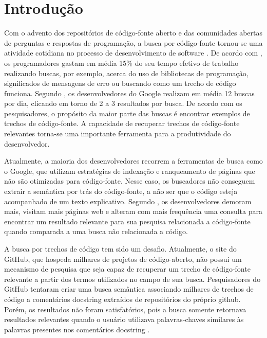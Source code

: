 \chapter{Introdução}
\label{cap:introducao}


Com o advento dos repositórios de código-fonte aberto e das comunidades abertas de perguntas e respostas de programação, a busca por código-fonte tornou-se uma atividade cotidiana no processo de desenvolvimento de software \citep{towards-summarizing-source-code-search:marin:2020}. De acordo com \cite{what-developers-search-for-on-the-web:xia:2017}, os programadores gastam em média 15\% do seu tempo efetivo de trabalho realizando buscas, por exemplo, acerca do uso de bibliotecas de programação, significados de mensagens de erro ou buscando como um trecho de código funciona. Segundo \cite{sadowski-how-developers-search-for-code-case-study:2015}, os desenvolvedores do Google realizam em média 12 buscas por dia, clicando em torno de 2 a 3 resultados por busca. De acordo com os pesquisadores, o propósito da maior parte das buscas é encontrar exemplos de trechos de código-fonte. A capacidade de recuperar trechos de código-fonte relevantes torna-se uma importante ferramenta para a produtividade do desenvolvedor. 

Atualmente, a maioria dos desenvolvedores recorrem a ferramentas de busca como o Google, que utilizam estratégias de indexação e ranqueamento de páginas que não são otimizadas para código-fonte. Nesse caso, os buscadores não conseguem extrair a semântica por trás do código-fonte, a não ser que o código esteja acompanhado de um texto explicativo. Segundo \cite{masudur-developers-use-google-code-retrieval:2018}, os desenvolvedores demoram mais, visitam mais páginas web e alteram com mais frequência uma consulta para encontrar um resultado relevante para sua pesquisa relacionada a código-fonte quando comparada a uma busca não relacionada a código.

A busca por trechos de código tem sido um desafio. Atualmente, o site do GitHub, que hospeda milhares de projetos de código-aberto, não possui um mecanismo de pesquisa que
seja capaz de recuperar um trecho de código-fonte relevante a partir dos termos utilizados no campo de sua busca. Pesquisadores do GitHub tentaram criar uma busca semântica associando milhares de trechos de código a comentários \gls{docstring} extraídos de repositórios do próprio \Gls{github}. Porém, os resultados não foram satisfatórios, pois a busca somente retornava resultados relevantes quando o usuário utilizava palavras-chaves similares às palavras presentes nos comentários \gls{docstring} \citep{husain-github-semantic-search-code-2019}. 

